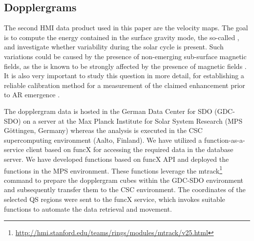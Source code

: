 \documentclass{aa}
\begin{document}

\subsection{Dopplergrams}

The second HMI data product used in this paper are the \los{} velocity maps. The goal is to compute the 
energy contained in the
surface gravity mode, the so-called \fffns,
and investigate whether variability during the solar cycle is present. Such variations could be caused by the presence of non-emerging sub-surface magnetic fields, as the \fff is known
to be strongly affected by the presence of magnetic fields . 
It is also very important to study this question in more detail, for establishing a reliable calibration method 
for a measurement of
the claimed 
\fff enhancement prior to AR emergence \cite{SRB16,Waidele22}. 

The dopplergram data is hosted in the German Data Center for SDO (GDC-SDO) on a server at the Max Planck Institute for Solar System Research (MPS Göttingen, Germany) whereas the analysis is executed in the CSC supercomputing environment (Aalto, Finland). We have utilized  a function-as-a-service client based on funcX \cite[]{chard20funcx} for accessing the required data in the database server. We have developed functions based on funcX API and deployed the functions in the MPS environment. These functions leverage the mtrack\footnote{\url{http://hmi.stanford.edu/teams/rings/modules/mtrack/v25.html}} command to prepare the dopplergram cubes within the GDC-SDO environment and subsequently transfer them to the CSC environment. The coordinates of the selected 
QS
regions were sent to the funcX service, which invokes suitable functions to automate the data retrieval and movement.

\end{document}
